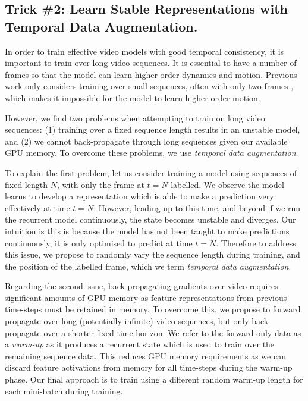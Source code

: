 \subsection{Trick \#2: Learn Stable Representations with Temporal Data Augmentation.}

In order to train effective video models with good temporal consistency, it is important to train over long video sequences. It is essential to have a number of frames so that the model can learn higher order dynamics and motion. Previous work only considers training over small sequences, often with only two frames \citep{gadde2017semantic}, which makes it impossible for the model to learn higher-order motion.

However, we find two problems when attempting to train on long video sequences: (1) training over a fixed sequence length results in an unstable model, and (2) we cannot back-propagate through long sequences given our available GPU memory. To overcome these problems, we use \textit{temporal data augmentation}.

To explain the first problem, let us consider training a model using sequences of fixed length $N$, with only the frame at $t=N$ labelled. We observe the model learns to develop a representation which is able to make a prediction very effectively at time $t=N$. However, leading up to this time, and beyond if we run the recurrent model continuously, the state becomes unstable and diverges. Our intuition is this is because the model has not been taught to make predictions continuously, it is only optimised to predict at time $t=N$. Therefore to address this issue, we propose to randomly vary the sequence length during training, and the position of the labelled frame, which we term \textit{temporal data augmentation}.

Regarding the second issue, back-propagating gradients over video requires significant amounts of GPU memory as feature representations from previous time-steps must be retained in memory. To overcome this, we propose to forward propagate over long (potentially infinite) video sequences, but only back-propagate over a shorter fixed time horizon. We refer to the forward-only data as a \textit{warm-up} as it produces a recurrent state which is used to train over the remaining sequence data. This reduces GPU memory requirements as we can discard feature activations from memory for all time-steps during the warm-up phase. Our final approach is to train using a different random warm-up length for each mini-batch during training.

